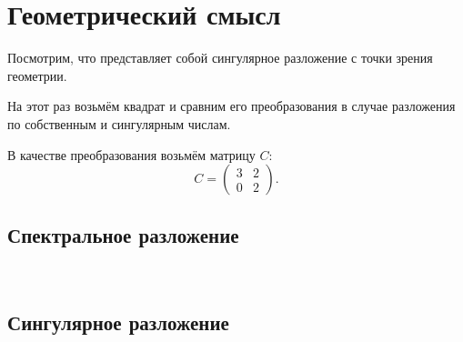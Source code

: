 \documentclass[11pt,a4paper]{article}
\begin{document}
    \hypertarget{ux433ux435ux43eux43cux435ux442ux440ux438ux447ux435ux441ux43aux438ux439-ux441ux43cux44bux441ux43b}{%
\section{Геометрический
смысл}\label{ux433ux435ux43eux43cux435ux442ux440ux438ux447ux435ux441ux43aux438ux439-ux441ux43cux44bux441ux43b}}

Посмотрим, что представляет собой сингулярное разложение с точки зрения
геометрии.

На этот раз возьмём квадрат и сравним его преобразования в случае
разложения по собственным и сингулярным числам.

В качестве преобразования возьмём матрицу \(C\): \[
  C = 
  \begin{pmatrix}
    3 & 2 \\
    0 & 2
  \end{pmatrix}.
\]


    \hypertarget{ux441ux43fux435ux43aux442ux440ux430ux43bux44cux43dux43eux435-ux440ux430ux437ux43bux43eux436ux435ux43dux438ux435}{%
\subsection{Спектральное
разложение}\label{ux441ux43fux435ux43aux442ux440ux430ux43bux44cux43dux43eux435-ux440ux430ux437ux43bux43eux436ux435ux43dux438ux435}}


    \begin{center}
    \end{center}
    { \hspace*{\fill} \\}
    
    \hypertarget{ux441ux438ux43dux433ux443ux43bux44fux440ux43dux43eux435-ux440ux430ux437ux43bux43eux436ux435ux43dux438ux435}{%
\subsection{Сингулярное
разложение}\label{ux441ux438ux43dux433ux443ux43bux44fux440ux43dux43eux435-ux440ux430ux437ux43bux43eux436ux435ux43dux438ux435}}


    \begin{center}
    \end{center}
    { \hspace*{\fill} \\}
    
\end{document}

